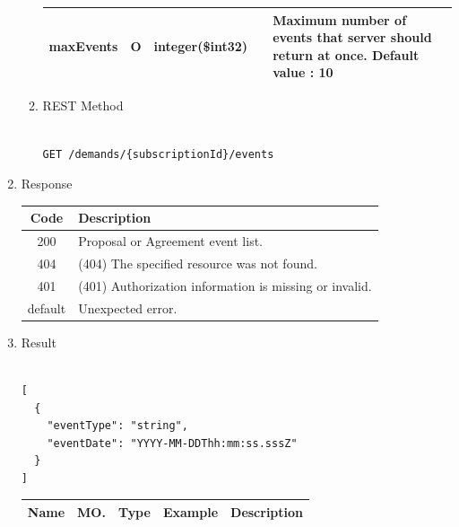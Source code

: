 \begin{enumerate}
\begin{enumerate}
\begin{center}
\begin{tabular}{|p{3cm}|l|p{3cm}|p{3cm}|p{4cm}|}
\hline

maxEvents		& O & integer(\$int32)	&		&	Maximum number of events that server should return at once.		Default value : 10 \\

\hline	

\end{tabular}
\end{center}

\item REST Method

\begin{tcolorbox}[boxrule=0pt, frame empty]
\begin{verbatim} 

GET /demands/{subscriptionId}/events

\end{verbatim}
\end{tcolorbox}

\end{enumerate}

\item Response

\begin{center}
\begin{tabular}{|c|l|} 
\hline
\rowcolor{lightgray}	Code 		& 	Description \\
\hline
200	 		&	Proposal or Agreement event list. \\
\hline
404			&	(404) The specified resource was not found. \\
\hline
401			&	(401) Authorization information is missing or invalid. \\
\hline
default		&	Unexpected error. \\
\hline
\end{tabular}
\end{center}


\item Result

\begin{tcolorbox}[boxrule=0pt, frame empty]
\begin{verbatim}

[
  {
    "eventType": "string",
    "eventDate": "YYYY-MM-DDThh:mm:ss.sssZ"
  }
]

\end{verbatim}
\end{tcolorbox}

\begin{center}
\begin{tabular}{|p{3cm}|l|p{3cm}|p{3cm}|p{4cm}|} 
\hline
\rowcolor{lightgray}	Name	& MO.	& Type	& Example & 	Description \\
\hline


\end{tabular}
\end{center}
\end{enumerate}
